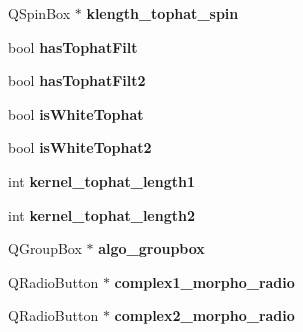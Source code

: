\begin{DoxyCompactItemize}
\item 
\hypertarget{classofeli_1_1_image_viewer_a47c6cff4ad2997151cd5fe094986b17a}{Q\-Spin\-Box $\ast$ {\bfseries klength\-\_\-tophat\-\_\-spin}}\label{classofeli_1_1_image_viewer_a47c6cff4ad2997151cd5fe094986b17a}

\item 
\hypertarget{classofeli_1_1_image_viewer_a703078008605fe4cc644a147904822b5}{bool {\bfseries has\-Tophat\-Filt}}\label{classofeli_1_1_image_viewer_a703078008605fe4cc644a147904822b5}

\item 
\hypertarget{classofeli_1_1_image_viewer_a75b914193ae9d6d3e1cd56d8a7c0bd68}{bool {\bfseries has\-Tophat\-Filt2}}\label{classofeli_1_1_image_viewer_a75b914193ae9d6d3e1cd56d8a7c0bd68}

\item 
\hypertarget{classofeli_1_1_image_viewer_a7ff4bed5ab6bae0033120cfdc51a31f6}{bool {\bfseries is\-White\-Tophat}}\label{classofeli_1_1_image_viewer_a7ff4bed5ab6bae0033120cfdc51a31f6}

\item 
\hypertarget{classofeli_1_1_image_viewer_ab2d12a0de1c94af3a6440b9c29fc3fc0}{bool {\bfseries is\-White\-Tophat2}}\label{classofeli_1_1_image_viewer_ab2d12a0de1c94af3a6440b9c29fc3fc0}

\item 
\hypertarget{classofeli_1_1_image_viewer_a4b5a11085658835b035ebae84e62662a}{int {\bfseries kernel\-\_\-tophat\-\_\-length1}}\label{classofeli_1_1_image_viewer_a4b5a11085658835b035ebae84e62662a}

\item 
\hypertarget{classofeli_1_1_image_viewer_aebc01218f6a27e8cc328446a7d29df2b}{int {\bfseries kernel\-\_\-tophat\-\_\-length2}}\label{classofeli_1_1_image_viewer_aebc01218f6a27e8cc328446a7d29df2b}

\item 
\hypertarget{classofeli_1_1_image_viewer_a49add6e89123e241ca37260213c1c266}{Q\-Group\-Box $\ast$ {\bfseries algo\-\_\-groupbox}}\label{classofeli_1_1_image_viewer_a49add6e89123e241ca37260213c1c266}

\item 
\hypertarget{classofeli_1_1_image_viewer_a81f19750185da5c700ae13aa7c36afd1}{Q\-Radio\-Button $\ast$ {\bfseries complex1\-\_\-morpho\-\_\-radio}}\label{classofeli_1_1_image_viewer_a81f19750185da5c700ae13aa7c36afd1}

\item 
\hypertarget{classofeli_1_1_image_viewer_a657507a0e9b2c28bea047c58bbbe7861}{Q\-Radio\-Button $\ast$ {\bfseries complex2\-\_\-morpho\-\_\-radio}}\label{classofeli_1_1_image_viewer_a657507a0e9b2c28bea047c58bbbe7861}


\end{DoxyCompactItemize}
